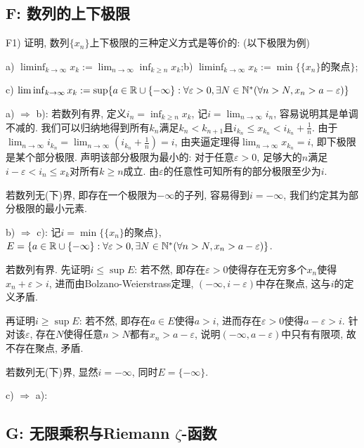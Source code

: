 \subsection*{F: 数列的上下极限}

F1) 证明, 数列$\{ x_n \}$上下极限的三种定义方式是等价的: (以下极限为例)

a) $\liminf_{k\to \infty} x_k:=\lim_{n\to \infty} \inf_{k \geq n} x_k$;\qquad b) $\liminf_{k\to \infty} x_k:= \min  \{\{ x_n \}\text{的聚点} \}$; 

c) $\liminf_{k\to \infty} x_k:= \sup \{ a\in \mathbb{R} \cup \{ -\infty \}: \forall \varepsilon >0, \exists N \in \mathbb{N}^{*} (\forall n>N, x_n>a-\varepsilon ) \}$

\begin{solution}
	a) $\Rightarrow$ b): 若数列有界, 定义$i_n=\inf_{k\geq n}x_k$, 记$i=\lim_{n\to \infty} i_{n}$, 容易说明其是单调不减的. 我们可以归纳地得到所有$k_n$满足$k_n<k_{n+1}$且$i_{k_n} \leq x_{k_n} < i_{k_n}+\frac{1}{n}$. 由于$\lim_{n\to \infty} i_{k_n} = \lim_{n\to \infty} (i_{k_n}+\frac{1}{n} ) = i$, 由夹逼定理得$\lim_{n\to \infty} x_{k_n}=i$, 即下极限是某个部分极限. 声明该部分极限为最小的: 对于任意$\varepsilon >0$, 足够大的$n$满足$i-\varepsilon < i_n \leq x_k$对所有$k \geq n$成立. 由$\varepsilon$的任意性可知所有的部分极限至少为$i$. 
	
	若数列无(下)界, 即存在一个极限为$-\infty$的子列, 容易得到$i=-\infty$, 我们约定其为部分极限的最小元素. 
	
	b) $\Rightarrow$ c): 记$i=\min  \{\{ x_n \}\text{的聚点} \}$, $E = \{ a\in \mathbb{R} \cup \{ -\infty \}: \forall \varepsilon >0, \exists N \in \mathbb{N}^{*} (\forall n>N, x_n>a-\varepsilon ) \}$. 
	
	若数列有界. 先证明$i \leq \sup E$: 若不然, 即存在$\varepsilon >0$使得存在无穷多个$x_n$使得$x_n+\varepsilon >i$, 进而由Bolzano-Weierstrass定理, $(-\infty ,i-\varepsilon)$中存在聚点, 这与$i$的定义矛盾. 
	
	再证明$i \geq \sup E$: 若不然, 即存在$a \in E$使得$a>i$, 进而存在$\varepsilon >0$使得$a-\varepsilon >i$. 针对该$\varepsilon$, 存在$N$使得任意$n>N$都有$x_n>a-\varepsilon$, 说明$(-\infty ,a-\varepsilon)$中只有有限项, 故不存在聚点, 矛盾. 
	
	若数列无(下)界, 显然$i=-\infty$, 同时$E=\{ -\infty \}$. 
	
	c) $\Rightarrow$ a): 
\end{solution}


\subsection*{G: 无限乘积与Riemann $\zeta$-函数}

